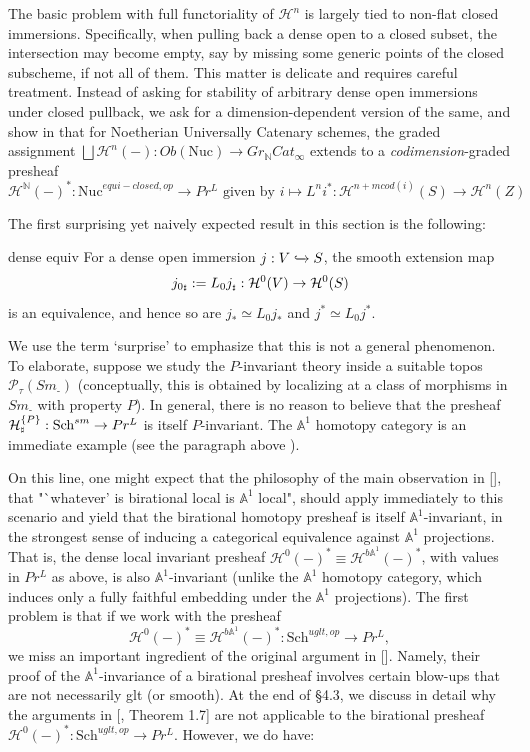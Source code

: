 The basic problem with full functoriality of $\mathcal{H}^n$ is largely tied to non-flat closed immersions. Specifically, when pulling back a dense open to a closed subset, the intersection may become empty, say by missing some generic points of the closed subscheme, if not all of them. This matter is delicate and requires careful treatment. Instead of asking for stability of arbitrary dense open immersions under closed pullback, we ask for a dimension-dependent version of the same, and show in  that for Noetherian Universally Catenary schemes, the graded assignment $\bigsqcup \mathcal{H}^n(-): Ob(\mathrm{Nuc})\to Gr_\mathbb{N}Cat_\infty$ extends to a \textit{codimension}-graded presheaf $$\mathcal{H}^\mathbb{N}(-)^*:\mathrm{Nuc}^{equi-closed,op}\to Pr^L\text{ given by }i\mapsto L^{n}i^*: \mathcal{H}^{{n+mcod(i)}}(S) \rightarrow \mathcal{H}^{n}(Z)$$ 


The first surprising yet naively expected result in this section is the following:

    \begin{recall*}{dense equiv}
       For a dense open immersion $j:V\xhookrightarrow{}S$, the smooth extension map $$j_{0{\mathord{\text{\tiny $\sharp$}}}}:=L_{0}j_{\mathord{\text{\tiny $\sharp$}}} :\mathcal{H}^0(V)\to \mathcal{H}^0(S)$$ is an equivalence, and hence so are $j_*\simeq L_{0}j_*$ and $j^*\simeq L_{0}j^*$.
    \end{recall*}
We use the term `surprise' to emphasize that this is not a general phenomenon. To elaborate, suppose we study the $P$-invariant theory inside a suitable topos $\mathcal{P}_\tau(Sm_{\mbox{-}})$ (conceptually, this is obtained by localizing at a class of morphisms in $Sm_{\mbox{-}}$ with property $P$). In general, there is no reason to believe that the presheaf $\mathcal{H}_{{\mathord{\text{\tiny $\sharp$}}}}^{\{P\}}: \mathrm{Sch}^{sm}\to Pr^L$ is itself $P$-invariant. The $\mathbb{A}^1$ homotopy category is an immediate example (see the paragraph above ). 

On this line, one might expect that the philosophy of the main observation in [\cite{0bat}], that "`whatever' is birational local is $\mathbb{A}^1$ local", should apply immediately to this scenario and yield that the birational homotopy presheaf is itself $\mathbb{A}^1$-invariant, in the strongest sense of inducing a categorical equivalence against $\mathbb{A}^1$ projections. That is, the dense local invariant presheaf $\mathcal{H}^{0}(-)^*\equiv \mathcal{H}^{b\mathbb{A}^1}(-)^*$, with values in $Pr^L$ as above, is also $\mathbb{A}^1$-invariant (unlike the $\mathbb{A}^1$ homotopy category, which induces only a fully faithful embedding under the $\mathbb{A}^1$ projections). The first problem is that if we work with the presheaf $$\mathcal{H}^0(-)^*\equiv \mathcal{H}^{b\mathbb{A}^1}(-)^*: \mathrm{Sch}^{uglt,op}\to Pr^L,$$ we miss an important ingredient of the original argument in [\cite{cisinski2023homotopy}]. Namely, their proof of the $\mathbb{A}^1$-invariance of a birational presheaf involves certain blow-ups that are not necessarily glt (or smooth). At the end of \S4.3, we discuss in detail why the arguments in [\cite{cisinski2023homotopy}, Theorem 1.7] are not applicable to the birational presheaf $\mathcal{H}^0(-)^*: \mathrm{Sch}^{uglt,op}\to Pr^L$. However, we do have:

